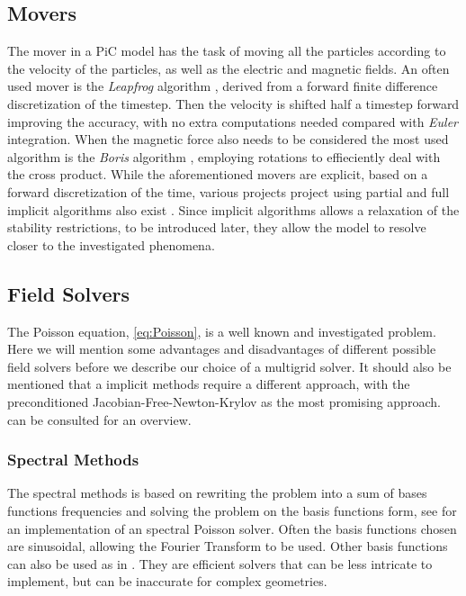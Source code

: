 	\subsection{Movers}
		The mover in a PiC model has the task of moving all the particles according to
		the velocity of the particles, as well as the electric and magnetic fields.
		An often used mover is the \textit{Leapfrog} algorithm \citep{birdsall_plasma_2004},
 		derived from a forward finite difference discretization of the timestep. Then the
 		velocity is shifted half a timestep forward improving the accuracy, with no extra computations needed compared
		with \textit{Euler} integration. When the magnetic force also needs to be considered
		the most used algorithm is the  \textit{Boris} algorithm \citep{qin_why_2013}, employing rotations to effieciently deal with
		the cross product.
		While the aforementioned movers are explicit, based on a forward discretization of the time,
 		various projects project using partial and full implicit algorithms also exist \citep{friedman_direct_1981,lapenta_particle_????}.
		Since implicit algorithms allows a relaxation of the stability restrictions, to be introduced later, they allow
		the model to resolve closer to the investigated phenomena.


    \subsection{Field Solvers}
	\label{sec:solvers}
    The Poisson equation, \cref{eq:Poisson}, is a well known and investigated problem.
    Here we will mention some advantages and disadvantages of different possible
    field solvers before we describe our choice of a multigrid solver. It should also
	be mentioned that a implicit methods require a different approach, with the preconditioned Jacobian-Free-Newton-Krylov as the most promising approach.
	\citet{lapenta_particle_2012} can be consulted for an overview.

    \subsubsection{Spectral Methods}
    	The spectral methods is based on rewriting the problem into a sum of bases functions
		frequencies and solving the problem on the basis functions form, see \citet{israeli_accurate_2005} for an
    	implementation of an spectral Poisson solver. Often the basis functions chosen are
 		sinusoidal, allowing the Fourier Transform to be used. Other basis functions can also be used as in
		\citet{shen_efficient_1994}. They are efficient solvers that
    	can be less intricate to implement, but can be inaccurate for complex geometries.

